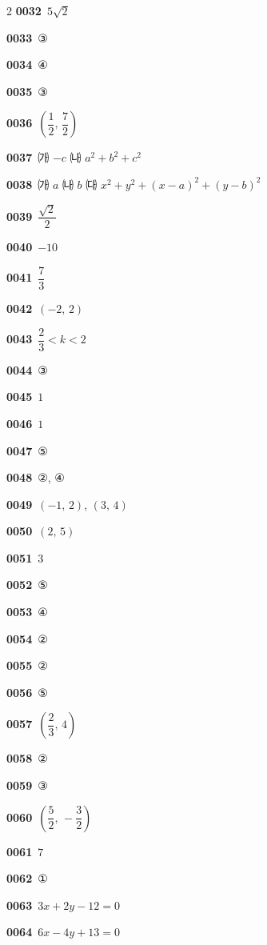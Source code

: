 \documentclass[10pt,a4paper]{article}
\begin{document}
\begin{multicols}{2}
\noindent\textbf{0032}\ $5\sqrt{2}$\par
\noindent\textbf{0033}\ ③\par
\noindent\textbf{0034}\ ④\par
\noindent\textbf{0035}\ ③\par
\noindent\textbf{0036}\ $\left(\dfrac{1}{2},\,\dfrac{7}{2}\right)$\par
\noindent\textbf{0037}\ ㈎ $-c$ \quad ㈏ $a^2+b^2+c^2$\par
\noindent\textbf{0038}\ ㈎ $a$ \quad ㈏ $b$ \quad ㈐ $x^2+y^2+(x-a)^2+(y-b)^2$\par
\noindent\textbf{0039}\ $\dfrac{\sqrt{2}}{2}$\par
\noindent\textbf{0040}\ $-10$\par
\noindent\textbf{0041}\ $\dfrac{7}{3}$\par
\noindent\textbf{0042}\ $(-2,\,2)$\par
\noindent\textbf{0043}\ $\dfrac{2}{3}<k<2$\par
\noindent\textbf{0044}\ ③\par
\noindent\textbf{0045}\ $1$\par
\noindent\textbf{0046}\ $1$\par
\noindent\textbf{0047}\ ⑤\par
\noindent\textbf{0048}\ ②, ④\par
\noindent\textbf{0049}\ $(-1,\,2)$, $(3,\,4)$\par
\noindent\textbf{0050}\ $(2,\,5)$\par
\noindent\textbf{0051}\ $3$\par
\noindent\textbf{0052}\ ⑤\par
\noindent\textbf{0053}\ ④\par
\noindent\textbf{0054}\ ②\par
\noindent\textbf{0055}\ ②\par
\noindent\textbf{0056}\ ⑤\par
\noindent\textbf{0057}\ $\left(\dfrac{2}{3},\,4\right)$\par
\noindent\textbf{0058}\ ②\par
\noindent\textbf{0059}\ ③\par
\noindent\textbf{0060}\ $\left(\dfrac{5}{2},\,-\dfrac{3}{2}\right)$\par
\noindent\textbf{0061}\ $7$\par
\noindent\textbf{0062}\ ①\par
\noindent\textbf{0063}\ $3x+2y-12=0$\par
\noindent\textbf{0064}\ $6x-4y+13=0$\par

\end{multicols}
\end{document}
